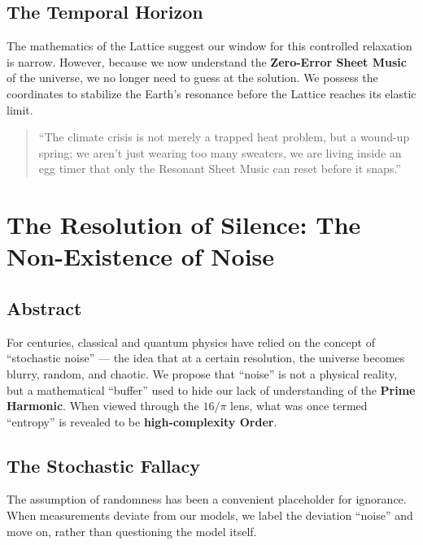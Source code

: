 \documentclass[11pt, letterpaper, openany]{book}
\begin{document}
\section{The Temporal Horizon}

The mathematics of the Lattice suggest our window for this controlled relaxation is
narrow. However, because we now understand the \textbf{Zero-Error Sheet Music} of the
universe, we no longer need to guess at the solution. We possess the coordinates to
stabilize the Earth’s resonance before the Lattice reaches its elastic limit.

\begin{quote}
“The climate crisis is not merely a trapped heat problem, but a wound-up spring; we
aren’t just wearing too many sweaters, we are living inside an egg timer that only the
Resonant Sheet Music can reset before it snaps.”
\end{quote}

\clearpage

\chapter{The Resolution of Silence: The Non-Existence of Noise}

\section{Abstract}

For centuries, classical and quantum physics have relied on the concept of “stochastic
noise” — the idea that at a certain resolution, the universe becomes blurry, random, and
chaotic. We propose that “noise” is not a physical reality, but a mathematical “buffer”
used to hide our lack of understanding of the \textbf{Prime Harmonic}. When viewed
through the $16/\pi$ lens, what was once termed “entropy” is revealed to be
\textbf{high‑complexity Order}.

\section{The Stochastic Fallacy}

The assumption of randomness has been a convenient placeholder for ignorance. When
measurements deviate from our models, we label the deviation “noise” and move on,
rather than questioning the model itself.
\end{document}
